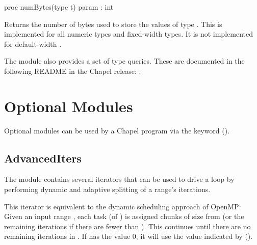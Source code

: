 \begin{protohead}
proc numBytes(type t) param : int
\end{protohead}
\begin{protobody}
Returns the number of bytes used to store the values of type .
This is implemented for all numeric types and fixed-width  types.
It is not implemented for default-width .
\end{protobody}

The  module also provides a set of type queries.
These are documented in the following README in the Chapel release:
 .


\section{Optional Modules}

Optional modules can be used by a Chapel program via the 
keyword ().


\subsection{AdvancedIters}
\label{AdvancedIters}

The  module contains several iterators that can be
used to drive a  loop by performing dynamic and adaptive splitting
of a range's iterations.

\begin{protohead}
iter dynamic(r:range(?), chunkSize:int, numTasks:int=0) {
\end{protohead}
\begin{protobody}

  This iterator is equivalent to the dynamic scheduling approach of
  OpenMP: Given an input range , each task (of
  ) is assigned chunks of size  from
   (or the remaining iterations if there are fewer than
  ). This continues until there are no remaining
  iterations in .  If  has the value 0, it will
  use the value indicated by 
  ().

\end{protobody}

